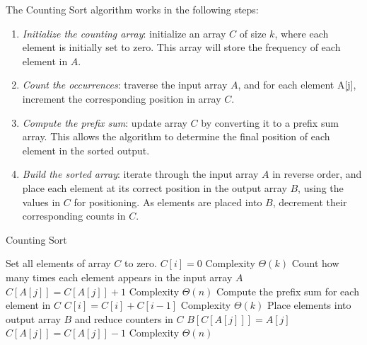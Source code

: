 The Counting Sort algorithm works in the following steps:
\begin{enumerate}
    \item \textit{Initialize the counting array}: initialize an array $C$ of size $k$, where each element is initially set to zero. 
        This array will store the frequency of each element in $A$.
    \item \textit{Count the occurrences}: traverse the input array $A$, and for each element A[j], increment the corresponding position in array $C$.
    \item \textit{Compute the prefix sum}: update array $C$ by converting it to a prefix sum array. 
        This allows the algorithm to determine the final position of each element in the sorted output.
    \item \textit{Build the sorted array}: iterate through the input array $A$ in reverse order, and place each element at its correct position in the output array $B$, using the values in $C$ for positioning. 
        As elements are placed into $B$, decrement their corresponding counts in $C$.
\end{enumerate}
\begin{algorithm}[H]
    \caption{Counting Sort}
    \begin{algorithmic}[1]
         \Comment Set all elements of array $C$ to zero.
            \State $C[i]=0$ 
        \EndFor \Comment Complexity $\Theta(k)$
         \Comment Count how many times each element appears in the input array $A$
            \State $C[A[j]]=C[A[j]]+1$ 
        \EndFor \Comment Complexity $\Theta(n)$
         \Comment Compute the prefix sum for each element in $C$
            \State $C[i]=C[i]+C[i-1]$ 
        \EndFor \Comment Complexity $\Theta(k)$
         \Comment Place elements into output array $B$ and reduce counters in $C$
            \State $B[C[A[j]]]=A[j]$
            \State $C[A[j]]=C[A[j]]-1$ 
        \EndFor \Comment Complexity $\Theta(n)$
    \end{algorithmic}
\end{algorithm}  
